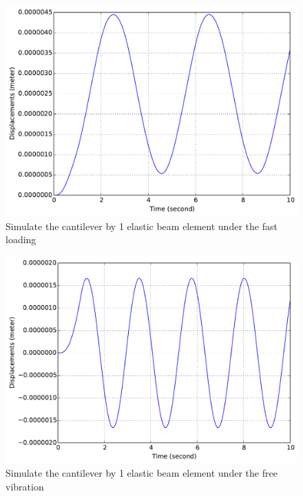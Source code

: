 \begin{figure}[!htb]
  \centering
  \includegraphics[width=12cm]{./Figure-files/_Chapter_Appendix_Illustrative_Examples/beam-mass-1element-fastLoading.pdf}
  \caption{Simulate the cantilever by 1 elastic beam element under the fast loading}
  \label{fig_beam-mass-fast}
\end{figure}

\begin{figure}[!htb]
  \centering
  \includegraphics[width=12cm]{./Figure-files/_Chapter_Appendix_Illustrative_Examples/beam-mass-1element-freeVibration.pdf}
  \caption{Simulate the cantilever by 1 elastic beam element under the free vibration}
  \label{fig_beam-mass-freevibr}
\end{figure}













